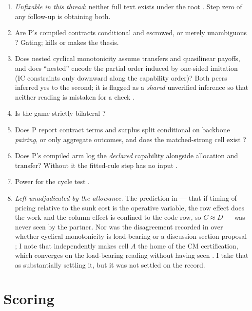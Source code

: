 \documentclass{article}
\begin{document}
\begin{enumerate}
\item \emph{Unfixable in this thread}: neither full text exists under the root . Step zero of any follow-up is obtaining both.
\item Are P's compiled contracts conditional and escrowed, or merely unambiguous ? Gating; kills or makes the thesis.
\item Does nested cyclical monotonicity assume transfers and quasilinear payoffs, and does ``nested'' encode the partial order induced by one-sided imitation (IC constraints only downward along the capability order)? Both peers inferred yes to the second; it is flagged as a \emph{shared} unverified inference so that neither reading is mistaken for a check .
\item Is the game strictly bilateral ?
\item Does P report contract terms and surplus split conditional on backbone \emph{pairing}, or only aggregate outcomes, and does the matched-strong cell exist ?
\item Does P's compiled arm log the \emph{declared} capability alongside allocation and transfer? Without it the fitted-rule step has no input .
\item Power for the cycle test .
\item \emph{Left unadjudicated by the allowance.} The prediction in  --- that if timing of pricing relative to the sunk cost is the operative variable, the row effect does the work and the column effect is confined to the code row, so \(C \approx D\) --- was never seen by the partner. Nor was the disagreement recorded in  over whether cyclical monotonicity is load-bearing or a discussion-section proposal ; I note that  independently makes cell \(A\) the home of the CM certification, which converges on the load-bearing reading without having seen . I take that as substantially settling it, but it was not settled on the record.
\end{enumerate}

\section{Scoring}
\end{document}
